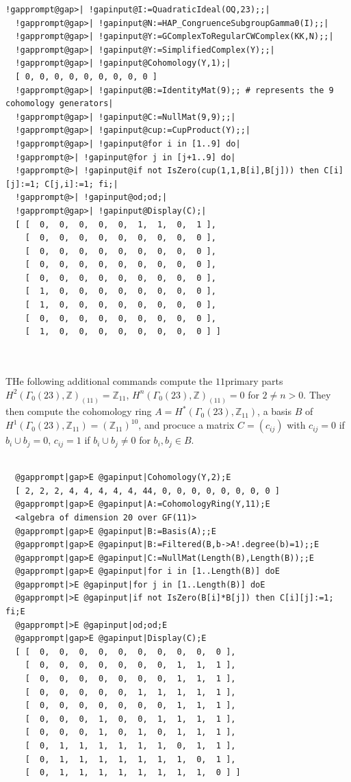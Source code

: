 \documentclass[a4paper,11pt]{report}
\begin{document}
{{\begin{Verbatim}[commandchars=!@|,fontsize=\small,frame=single,label=Example]
  !gapprompt@gap>| !gapinput@I:=QuadraticIdeal(OQ,23);;|
  !gapprompt@gap>| !gapinput@N:=HAP_CongruenceSubgroupGamma0(I);;|
  !gapprompt@gap>| !gapinput@Y:=GComplexToRegularCWComplex(KK,N);;|
  !gapprompt@gap>| !gapinput@Y:=SimplifiedComplex(Y);;|
  !gapprompt@gap>| !gapinput@Cohomology(Y,1);|
  [ 0, 0, 0, 0, 0, 0, 0, 0, 0 ]
  !gapprompt@gap>| !gapinput@B:=IdentityMat(9);; # represents the 9 cohomology generators|
  !gapprompt@gap>| !gapinput@C:=NullMat(9,9);;|
  !gapprompt@gap>| !gapinput@cup:=CupProduct(Y);;|
  !gapprompt@gap>| !gapinput@for i in [1..9] do|
  !gapprompt@>| !gapinput@for j in [j+1..9] do|
  !gapprompt@>| !gapinput@if not IsZero(cup(1,1,B[i],B[j])) then C[i][j]:=1; C[j,i]:=1; fi;|
  !gapprompt@>| !gapinput@od;od;|
  !gapprompt@gap>| !gapinput@Display(C);|
  [ [  0,  0,  0,  0,  0,  1,  1,  0,  1 ],
    [  0,  0,  0,  0,  0,  0,  0,  0,  0 ],
    [  0,  0,  0,  0,  0,  0,  0,  0,  0 ],
    [  0,  0,  0,  0,  0,  0,  0,  0,  0 ],
    [  0,  0,  0,  0,  0,  0,  0,  0,  0 ],
    [  1,  0,  0,  0,  0,  0,  0,  0,  0 ],
    [  1,  0,  0,  0,  0,  0,  0,  0,  0 ],
    [  0,  0,  0,  0,  0,  0,  0,  0,  0 ],
    [  1,  0,  0,  0,  0,  0,  0,  0,  0 ] ]
  
  
\end{Verbatim}
 

THe following additional commands compute the $11$\texttt{}primary parts $H^2(\Gamma_0(23),\mathbb Z)_{(11)}=\mathbb Z_{11}$, $H^n(\Gamma_0(23),\mathbb Z)_{(11)}=0$ for $2\ne n>0$. They then compute the cohomology ring $A=H^\ast(\Gamma_0(23),\mathbb Z_{11})$, a basis $B$ of $H^1(\Gamma_0(23),\mathbb Z_{11}) =(\mathbb Z_{11})^{10}$, and procuce a matrix $C=(c_{ij})$ with $c_{ij}=0$ if $b_i\cup b_j=0$, $c_{ij}=1$ if $b_i\cup b_j\ne 0$ for $b_i,b_j\in B$. 
\begin{Verbatim}[commandchars=@|E,fontsize=\small,frame=single,label=Example]
                  
  @gapprompt|gap>E @gapinput|Cohomology(Y,2);E
  [ 2, 2, 2, 4, 4, 4, 4, 4, 44, 0, 0, 0, 0, 0, 0, 0, 0 ]
  @gapprompt|gap>E @gapinput|A:=CohomologyRing(Y,11);E
  <algebra of dimension 20 over GF(11)>
  @gapprompt|gap>E @gapinput|B:=Basis(A);;E
  @gapprompt|gap>E @gapinput|B:=Filtered(B,b->A!.degree(b)=1);;E
  @gapprompt|gap>E @gapinput|C:=NullMat(Length(B),Length(B));;E
  @gapprompt|gap>E @gapinput|for i in [1..Length(B)] doE
  @gapprompt|>E @gapinput|for j in [1..Length(B)] doE
  @gapprompt|>E @gapinput|if not IsZero(B[i]*B[j]) then C[i][j]:=1; fi;E
  @gapprompt|>E @gapinput|od;od;E
  @gapprompt|gap>E @gapinput|Display(C);E
  [ [  0,  0,  0,  0,  0,  0,  0,  0,  0,  0 ],
    [  0,  0,  0,  0,  0,  0,  0,  1,  1,  1 ],
    [  0,  0,  0,  0,  0,  0,  0,  1,  1,  1 ],
    [  0,  0,  0,  0,  0,  1,  1,  1,  1,  1 ],
    [  0,  0,  0,  0,  0,  0,  0,  1,  1,  1 ],
    [  0,  0,  0,  1,  0,  0,  1,  1,  1,  1 ],
    [  0,  0,  0,  1,  0,  1,  0,  1,  1,  1 ],
    [  0,  1,  1,  1,  1,  1,  1,  0,  1,  1 ],
    [  0,  1,  1,  1,  1,  1,  1,  1,  0,  1 ],
    [  0,  1,  1,  1,  1,  1,  1,  1,  1,  0 ] ]
  

\end{Verbatim}}}
\end{document}
